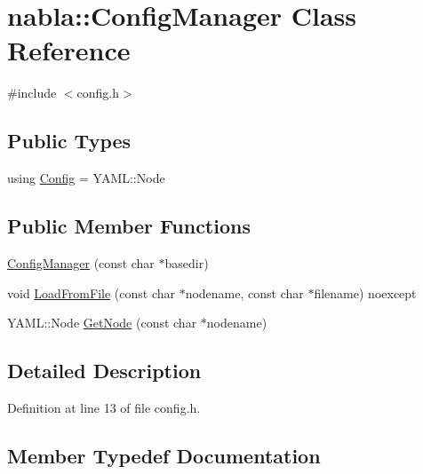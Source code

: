 \hypertarget{classnabla_1_1_config_manager}{}\section{nabla\+::Config\+Manager Class Reference}
\label{classnabla_1_1_config_manager}


{\ttfamily \#include $<$config.\+h$>$}

\subsection*{Public Types}
\begin{DoxyCompactItemize}
\item 
using \mbox{\hyperlink{classnabla_1_1_config_manager_a5d11666f077c13edacfb28d2740d0c3c}{Config}} = Y\+A\+M\+L\+::\+Node
\end{DoxyCompactItemize}
\subsection*{Public Member Functions}
\begin{DoxyCompactItemize}
\item 
\mbox{\hyperlink{classnabla_1_1_config_manager_a4b294db3e540397228a75723b6d19b63}{Config\+Manager}} (const char $\ast$basedir)
\item 
void \mbox{\hyperlink{classnabla_1_1_config_manager_a020b971d5179f9e92dd95f426e68fba9}{Load\+From\+File}} (const char $\ast$nodename, const char $\ast$filename) noexcept
\item 
Y\+A\+M\+L\+::\+Node \mbox{\hyperlink{classnabla_1_1_config_manager_ac20c088af8a93d3bf44fa2d85bcba3d1}{Get\+Node}} (const char $\ast$nodename)
\end{DoxyCompactItemize}


\subsection{Detailed Description}


Definition at line 13 of file config.\+h.



\subsection{Member Typedef Documentation}
\mbox{\label{classnabla_1_1_config_manager_a5d11666f077c13edacfb28d2740d0c3c}} 
